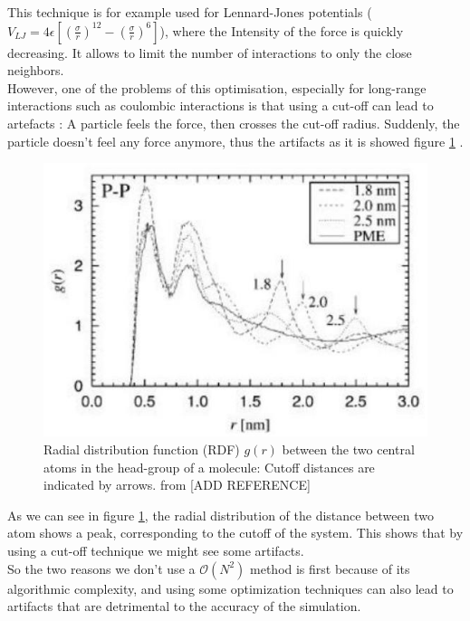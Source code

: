 \documentclass[11pt,twoside,a4paper]{report}
\begin{document}
This technique is for example used for Lennard-Jones potentials ($V_{LJ} = 4\epsilon [(\frac{\sigma}{r})^12 - (\frac{\sigma}{r})^6] $), where the Intensity of the force is quickly decreasing. It allows to limit the number of interactions to only the close neighbors.\\

However, one of the problems of this optimisation, especially for long-range interactions such as coulombic interactions is that using a cut-off can lead to artefacts : A particle feels the force, then crosses the cut-off radius. Suddenly, the particle doesn't feel any force anymore, thus the artifacts as it is showed figure \ref{fig:artefact} .

\begin{figure}[H]

\includegraphics[scale=0.8]{artefact}
 \centering
 
\caption{Radial distribution function (RDF) $g(r)$ between the two
central atoms in the head-group of a molecule: Cutoff distances are indicated by arrows. from [ADD REFERENCE]}

\label{fig:artefact}

\end{figure}


As we can see in figure \ref{fig:artefact},  the radial distribution of the distance between two atom shows a peak, corresponding to the cutoff of the system. This shows that by using a cut-off technique we might see some artifacts.\\

So the two reasons we don't use a $\mathcal{O}(N^2)$ method is first because of its algorithmic complexity, and using some optimization techniques can also lead to artifacts that are detrimental to the accuracy of the simulation.
\end{document}
